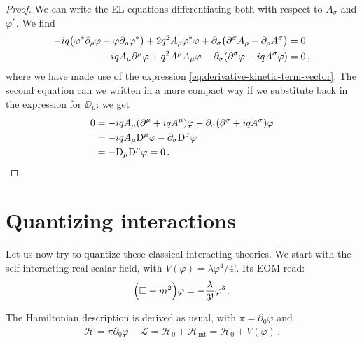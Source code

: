 \documentclass[main.tex]{subfiles}
\begin{document}
\begin{proof}
We can write the EL equations differentiating both with respect to \(A_{\sigma }\) and \(\varphi^{*}\). We find 
%
\begin{subequations}
\begin{align}
-iq \qty(\varphi^{*} \partial_{\rho } \varphi - \varphi \partial_{\rho } \varphi^{*})
+ 2 q^2 A_{\rho } \varphi^{*} \varphi 
+ \partial_{\sigma } \qty(\partial^{\sigma }A_{\rho } - \partial_\rho A^{\sigma })&= 0   \\
-iq A_{\mu } \partial^{\mu } \varphi 
+ q^2 A^{\mu } A_{\mu } \varphi 
- \partial_{\sigma } \qty(
\partial^{\sigma } \varphi 
+ i q A^{ \sigma } \varphi 
)
&=0 
\,,
\end{align}
\end{subequations}
%
where we have made use of the expression \eqref{eq:derivative-kinetic-term-vector}. 
The second equation can we written in a more compact way if we substitute back in the expression for \(\DD_{\mu }\): we get 
%
\begin{subequations}
\begin{align}
0 &=
-i q A_{\mu } \qty(\partial^{\mu } + i q A^{\mu } ) \varphi 
- \partial_{\sigma } \qty(\partial^{ \sigma } + i q A^{\sigma }) \varphi   \\
&= -iq A_{\mu } \mathrm{D}^{\mu } \varphi 
- \partial_{\sigma } \mathrm{D}^{\sigma } \varphi  \\
&= - \mathrm{D}_{\mu } \mathrm{D}^{\mu } \varphi =0
\,.
\end{align}
\end{subequations}
\end{proof}

\section{Quantizing interactions}

Let us now try to quantize these classical interacting theories. 
We start with the self-interacting real scalar field, with \(V(\varphi ) = \lambda \varphi^{4} / 4! \). Its EOM read: 
%
\begin{align}
\qty(\square + m^2) \varphi = - \frac{\lambda}{3!} \varphi^3
\,.
\end{align}

The Hamiltonian description is derived as usual, with \(\pi = \partial_0 \varphi \) and 
%
\begin{align}
\mathscr{H} =  \pi \partial_0 \varphi 
- \mathscr{L} =  \mathscr{H}_{0} + \mathscr{H} _{\text{int}}
= \mathscr{H}_{0} + V(\varphi )
\,.
\end{align}
\end{document}
